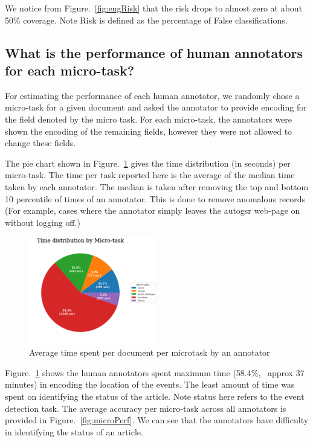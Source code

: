 We notice from Figure.~\ref{fig:engRisk} that the risk drops to almost zero at about 50\% coverage. Note Risk is defined as the percentage of False classifications.



\subsection{What is the performance of human annotators for each micro-task?}
For estimating the performance of each human annotator, we randomly chose a micro-task for a given document and asked the annotator to provide encoding for the field denoted by the micro task. For each micro-task, the annotators were shown the encoding of the remaining fields, however they were not allowed to change these fields.

The pie chart shown in Figure.~\ref{fig:microTimings} gives the time distribution (in seconds) per micro-task. The time per task reported here is the average of the median time taken by each annotator. The median is taken after removing the top and bottom 10 percentile of times of an annotator. This is done to remove anomalous records (For example, cases where the annotator simply leaves the autogsr web-page on without logging off.)

\begin{figure}[h!]
    \centering
    \includegraphics[width=0.5\textwidth]{figures/micro_task_timings.png}
    \caption{Average time spent per document per microtask by an annotator}
    \label{fig:microTimings}
\end{figure}

Figure.~\ref{fig:microTimings} shows the human annotators spent maximum time (58.4\%, ~approx 37 minutes) in encoding the location of the events. The least amount of  time was spent on  identifying the status of the article. Note status here refers to the event detection task.  The average accuracy per micro-task across all annotators is provided in Figure.~\ref{fig:microPerf}. We can see that the annotators have difficulty in identifying the status of an article.


